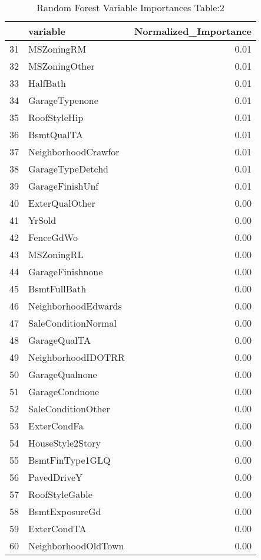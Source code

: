 \begin{table}[ht]
\centering
\begin{tabular}{rlr}
  \hline
 & variable & Normalized\_Importance \\ 
  \hline
31 & MSZoningRM & 0.01 \\ 
  32 & MSZoningOther & 0.01 \\ 
  33 & HalfBath & 0.01 \\ 
  34 & GarageTypenone & 0.01 \\ 
  35 & RoofStyleHip & 0.01 \\ 
  36 & BsmtQualTA & 0.01 \\ 
  37 & NeighborhoodCrawfor & 0.01 \\ 
  38 & GarageTypeDetchd & 0.01 \\ 
  39 & GarageFinishUnf & 0.01 \\ 
  40 & ExterQualOther & 0.00 \\ 
  41 & YrSold & 0.00 \\ 
  42 & FenceGdWo & 0.00 \\ 
  43 & MSZoningRL & 0.00 \\ 
  44 & GarageFinishnone & 0.00 \\ 
  45 & BsmtFullBath & 0.00 \\ 
  46 & NeighborhoodEdwards & 0.00 \\ 
  47 & SaleConditionNormal & 0.00 \\ 
  48 & GarageQualTA & 0.00 \\ 
  49 & NeighborhoodIDOTRR & 0.00 \\ 
  50 & GarageQualnone & 0.00 \\ 
  51 & GarageCondnone & 0.00 \\ 
  52 & SaleConditionOther & 0.00 \\ 
  53 & ExterCondFa & 0.00 \\ 
  54 & HouseStyle2Story & 0.00 \\ 
  55 & BsmtFinType1GLQ & 0.00 \\ 
  56 & PavedDriveY & 0.00 \\ 
  57 & RoofStyleGable & 0.00 \\ 
  58 & BsmtExposureGd & 0.00 \\ 
  59 & ExterCondTA & 0.00 \\ 
  60 & NeighborhoodOldTown & 0.00 \\ 
   \hline
\end{tabular}
\caption{Random Forest Variable Importances Table:2} 
\label{tab:importance2}
\end{table}

